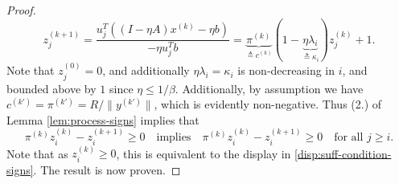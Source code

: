 \documentclass[11pt]{article}
\begin{document}
\begin{proof}
  \[
  z^{(k+1)}_j = \frac{u_j^T((I - \eta A) x^{(k)} - \eta b)}{-\eta u_j^Tb} = \underbrace{\pi^{(k)}}_{\triangleq c^{(k)}}(1 - \underbrace{\eta \lambda_i}_{
    \triangleq \kappa_i})
  z_j^{(k)} + 1. 
  \]
  Note that $z^{(0)}_j = 0$, and additionally $\eta \lambda_i = \kappa_i$ is non-decreasing in $i$, and bounded above by $1$ since $\eta \leq 1/\beta$. Additionally,
  by assumption we have $c^{(k')} = \pi^{(k')} = R/\|y^{(k')}\|$, which is evidently non-negative. Thus (2.) of
  Lemma \ref{lem:process-signs} implies that
  \[
  \pi^{(k)}z_i^{(k)} - z_i^{(k + 1)} \geq 0 \quad \text{implies} \quad \pi^{(k)}z_i^{(k)} - z_i^{(k + 1)} \geq 0 \quad \text{for all $j \geq i$.} 
  \]
  Note that as $z_i^{(k)} \geq 0$, this is equivalent to the display in \eqref{disp:suff-condition-signs}. The result is now proven.
\end{proof}
\end{document}
